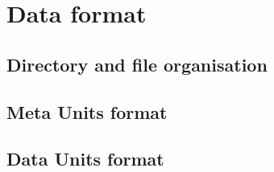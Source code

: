 \documentclass[a4paper]{article}
\begin{document}
 \tableofcontents
 \section{Data format}
 \subsection{Directory and file organisation}
  

  
 \subsection{Meta Units format}
  

  
 \subsection{Data Units format}
  

  
\end{document}
